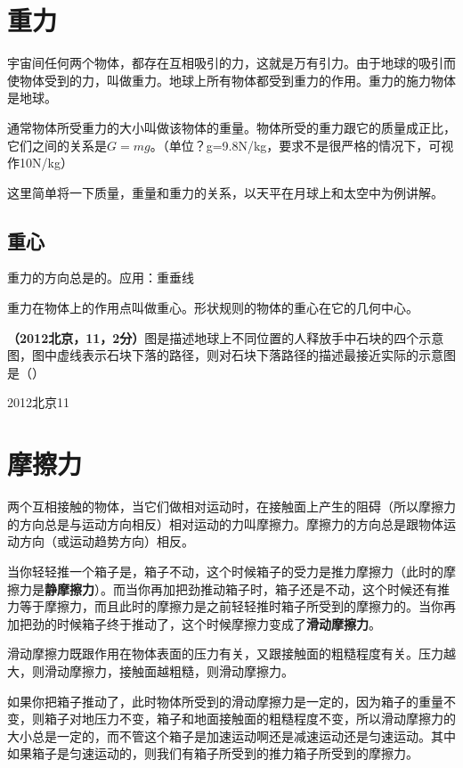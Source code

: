 \documentclass[12pt,twoside]{exam}
\begin{document}
\begin{knowledge}
\section{重力}
宇宙间任何两个物体，都存在互相吸引的力，这就是万有引力。由于地球的吸引而使物体受到的力，叫做重力。地球上所有物体都受到重力的作用。重力的施力物体是地球。

通常物体所受重力的大小叫做该物体的重量。物体所受的重力跟它的质量成正比，它们之间的关系是$G=mg$。（单位？g=9.8N/kg，要求不是很严格的情况下，可视作10N/kg）

这里简单将一下质量，重量和重力的关系，以天平在月球上和太空中为例讲解。


\subsection{重心}
重力的方向总是\answerline*[竖直向下]的。应用：重垂线

重力在物体上的作用点叫做重心。形状规则的物体的重心在它的几何中心。

\textbf{（2012北京，11，2分）}图是描述地球上不同位置的人释放手中石块的四个示意图，图中虚线表示石块下落的路径，则对石块下落路径的描述最接近实际的示意图是（\answerline*[B]）
\begin{linefig}{2012北京11}
\end{linefig}


\section{摩擦力}
两个互相接触的物体，当它们做相对运动时，在接触面上产生的阻碍（所以摩擦力的方向总是与运动方向相反）相对运动的力叫摩擦力。摩擦力的方向总是跟物体运动方向（或运动趋势方向）相反。

当你轻轻推一个箱子是，箱子不动，这个时候箱子的受力是推力\answerline*[等于]摩擦力（此时的摩擦力是\textbf{静摩擦力}）。而当你再加把劲推动箱子时，箱子还是不动，这个时候还有推力等于摩擦力，而且此时的摩擦力是\answerline*[大于]之前轻轻推时箱子所受到的摩擦力的。当你再加把劲的时候箱子终于推动了，这个时候摩擦力变成了\textbf{滑动摩擦力}。

滑动摩擦力既跟作用在物体表面的压力有关，又跟接触面的粗糙程度有关。压力越大，则滑动摩擦力\answerline*[越大]，接触面越粗糙，则滑动摩擦力\answerline*[越大]。

如果你把箱子推动了，此时物体所受到的滑动摩擦力是一定的，因为箱子的重量不变，则箱子对地压力不变，箱子和地面接触面的粗糙程度不变，所以滑动摩擦力的大小总是一定的，而不管这个箱子是加速运动啊还是减速运动还是匀速运动。其中如果箱子是匀速运动的，则我们有箱子所受到的推力\answerline*[等于]箱子所受到的摩擦力。


\end{knowledge}
\end{document}
